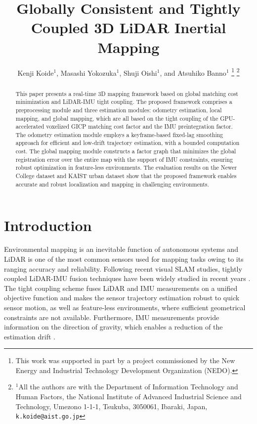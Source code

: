 \documentclass[letterpaper, 10 pt, conference]{ieeeconf}  %
\title{\LARGE \bf
Globally Consistent and Tightly Coupled 3D LiDAR Inertial Mapping
}
\author{Kenji Koide$^{1}$, Masashi Yokozuka$^{1}$, Shuji Oishi$^{1}$, and Atsuhiko Banno$^{1}$%
\thanks{This work was supported in part by a project commissioned by the New Energy and Industrial Technology Development Organization (NEDO).}%
\thanks{$^{1}$All the authors are with the Department of Information Technology and Human Factors, the National Institute of Advanced Industrial Science and Technology, Umezono 1-1-1, Tsukuba, 3050061, Ibaraki, Japan, {\tt\small k.koide@aist.go.jp}}%
}
\begin{document}
\maketitle
\thispagestyle{empty}
\pagestyle{empty}

\setlength\floatsep{8pt}
\setlength\textfloatsep{8pt}

\newcommand\blfootnote[1]{%
  \begingroup
  \renewcommand\thefootnote{}\footnote{#1}%
  \addtocounter{footnote}{-1}%
  \endgroup
}


\begin{abstract}

This paper presents a real-time 3D mapping framework based on global matching cost minimization and LiDAR-IMU tight coupling. The proposed framework comprises a preprocessing module and three estimation modules: odometry estimation, local mapping, and global mapping, which are all based on the tight coupling of the GPU-accelerated voxelized GICP matching cost factor and the IMU preintegration factor. The odometry estimation module employs a keyframe-based fixed-lag smoothing approach for efficient and low-drift trajectory estimation, with a bounded computation cost. The global mapping module constructs a factor graph that minimizes the global registration error over the entire map with the support of IMU constraints, ensuring robust optimization in feature-less environments. The evaluation results on the Newer College dataset and KAIST urban dataset show that the proposed framework enables accurate and robust localization and mapping in challenging environments.

\end{abstract}


\section{Introduction}

Environmental mapping is an inevitable function of autonomous systems and LiDAR is one of the most common sensors used for mapping tasks owing to its ranging accuracy and reliability. Following recent visual SLAM studies, tightly coupled LiDAR-IMU fusion techniques have been widely studied in recent years \cite{Ye2019,Qin2020}. The tight coupling scheme fuses LiDAR and IMU measurements on a unified objective function and makes the sensor trajectory estimation robust to quick sensor motion, as well as feature-less environments, where sufficient geometrical constraints are not available. Furthermore, IMU measurements provide information on the direction of gravity, which enables a reduction of the estimation drift \cite{Qin2018}.
\end{document}
